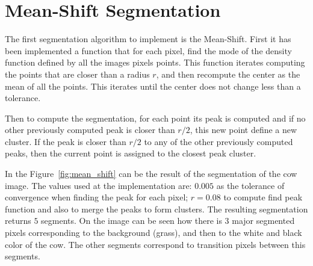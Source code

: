\documentclass{ethz_report}
\begin{document}
\section*{Mean-Shift Segmentation}

The first segmentation algorithm to implement is the Mean-Shift. First it has been implemented a function that for each pixel, find the mode of the density function defined by all the images pixels points.
This function iterates computing the points that are closer than a radius $r$, and then recompute the center as the mean of all the points.
This iterates until the center does not change less than a tolerance.

Then to compute the segmentation, for each point its peak is computed and if no other previously computed peak is closer than $r/2$, this new point define a new cluster.
If the peak is closer than $r/2$ to any of the other previously computed peaks, then the current point is assigned to the closest peak cluster.

In the Figure~\ref{fig:mean_shift} can be the result of the segmentation of the cow image.
The values used at the implementation are: $0.005$ as the tolerance of convergence when finding the peak for each pixel; $r = 0.08$ to compute find peak function and also to merge the peaks to form clusters.
The resulting segmentation returns $5$ segments. On the image can be seen how there is 3 major segmented pixels corresponding to the background (grass), and then to the white and black color of the cow. The other segments correspond to transition pixels between this segments.
\end{document}
